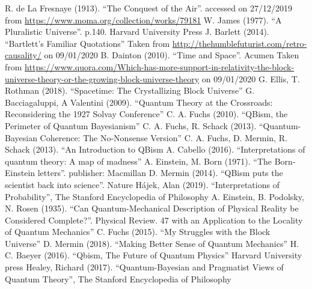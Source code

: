 \documentclass[11pt, a4 paper]{article}
\begin{document}
\newpage
\begin{thebibliography}{}
R. de La Fresnaye (1913). “The Conquest of the Air''.  accessed on 27/12/2019 from \url{https://www.moma.org/collection/works/79181}
W. James (1977). ``A Pluralistic Universe''. p.140. Harvard University Press
J. Barlett (2014). ``Bartlett's Familiar Quotations''
Taken from \url{http://thehumblefuturist.com/retro-causality/} on 09/01/2020
B. Dainton (2010). ``Time and Space''. Acumen
Taken from \url{https://www.quora.com/Which-has-more-support-in-relativity-the-block-universe-theory-or-the-growing-block-universe-theory} on 09/01/2020
G. Ellis, T. Rothman (2018). ``Spacetime: The Crystallizing Block Universe''
G. Bacciagaluppi, A Valentini (2009). ``Quantum Theory at the Crossroads: Reconsidering the 1927 Solvay Conference''
C. A. Fuchs (2010). ``QBism, the Perimeter of Quantum Bayesianism''
C. A. Fuchs, R. Schack (2013). “Quantum-Bayesian Coherence: The No-Nonsense Version''
C. A. Fuchs, D. Mermin, R. Schack (2013). ``An Introduction to QBism
A. Cabello (2016). ``Interpretations of quantum theory: A map of madness''
A. Einstein, M. Born (1971). ``The Born-Einstein letters''. publisher: Macmillan
D. Mermin (2014). ``QBism puts the scientist back into science''. Nature
Hájek, Alan (2019). ``Interpretations of Probability'', The Stanford Encyclopedia of Philosophy 
A. Einstein, B. Podolsky, N. Rosen (1935). ``Can Quantum-Mechanical Description of Physical Reality be Considered Complete?''. Physical Review. 47
with an Application to the Locality of Quantum Mechanics''
C. Fuchs (2015). ``My Struggles with the Block Universe''
D. Mermin (2018). ``Making Better Sense of Quantum Mechanics''
H. C. Baeyer (2016). ``Qbism, The Future of Quantum Physics'' Harvard University press
Healey, Richard (2017). ``Quantum-Bayesian and Pragmatist Views of Quantum Theory'', The Stanford Encyclopedia of Philosophy 
\end{thebibliography}
\end{document}
